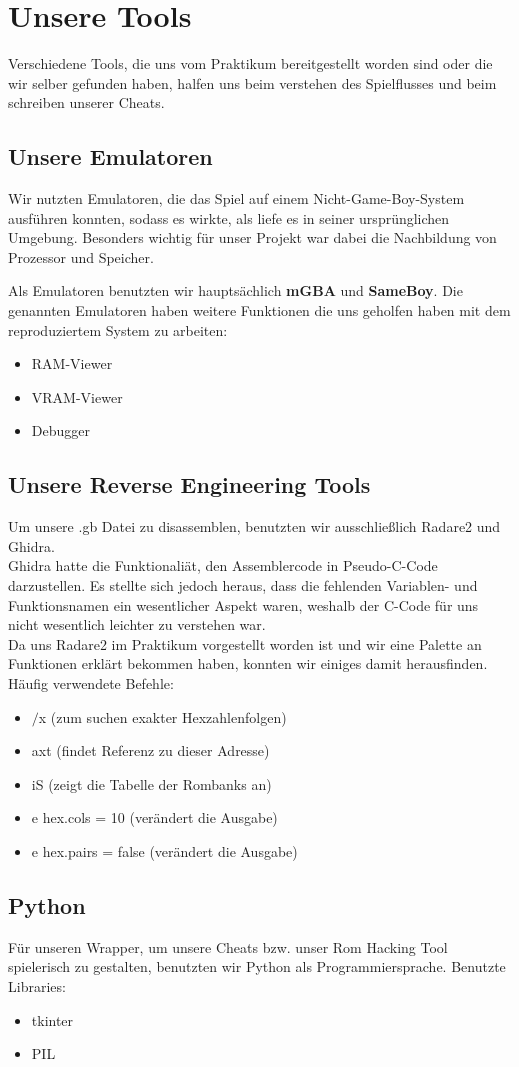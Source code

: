 \section{Unsere Tools}

Verschiedene Tools, die uns vom Praktikum bereitgestellt worden sind oder die wir selber gefunden haben, halfen uns beim verstehen des 
Spielflusses und beim schreiben unserer Cheats.

\subsection{Unsere Emulatoren}

Wir nutzten Emulatoren, die das Spiel auf einem Nicht-Game-Boy-System ausführen 
konnten, sodass es wirkte, als liefe es in seiner ursprünglichen Umgebung. Besonders 
wichtig für unser Projekt war dabei die Nachbildung von Prozessor und Speicher.

Als Emulatoren benutzten wir hauptsächlich \textbf{mGBA} und \textbf{SameBoy}. Die genannten Emulatoren haben weitere Funktionen 
die uns geholfen haben mit dem reproduziertem System zu arbeiten:
\begin{itemize}
    \item RAM-Viewer
    \item VRAM-Viewer
    \item Debugger
\end{itemize}

\subsection{Unsere Reverse Engineering Tools}

Um unsere .gb Datei zu disassemblen, benutzten wir ausschließlich Radare2 und Ghidra. \\

Ghidra hatte die Funktionaliät, den Assemblercode in Pseudo-C-Code darzustellen. Es stellte sich jedoch heraus, 
dass die fehlenden Variablen- und Funktionsnamen ein wesentlicher Aspekt waren, weshalb der C-Code für uns nicht wesentlich leichter zu verstehen war. \\

Da uns Radare2 im Praktikum vorgestellt worden ist und wir eine Palette an Funktionen erklärt bekommen haben, konnten wir einiges damit herausfinden.\\
Häufig verwendete Befehle: 
\begin{itemize}
    \item $/$x (zum suchen exakter Hexzahlenfolgen)
    \item axt (findet Referenz zu dieser Adresse)
    \item iS (zeigt die Tabelle der Rombanks an)
    \item e hex.cols = 10 (verändert die Ausgabe)
    \item e hex.pairs = false (verändert die Ausgabe)
\end{itemize}

\subsection{Python}
Für unseren Wrapper, um unsere Cheats bzw. unser Rom Hacking Tool spielerisch zu gestalten, benutzten wir Python als Programmiersprache. 
Benutzte Libraries:
\begin{itemize}
    \item tkinter
    \item PIL
\end{itemize}
